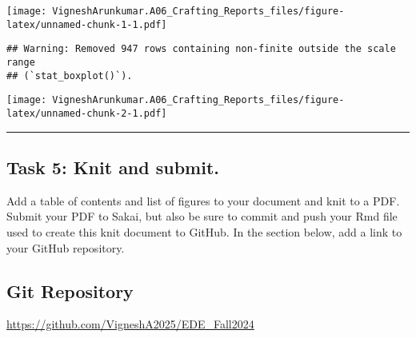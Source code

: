 \documentclass[
]{article}
\begin{document}
\texttt{[image: VigneshArunkumar.A06\_Crafting\_Reports\_files/figure-latex/unnamed-chunk-1-1.pdf]}

\begin{verbatim}
## Warning: Removed 947 rows containing non-finite outside the scale range
## (`stat_boxplot()`).
\end{verbatim}

\texttt{[image: VigneshArunkumar.A06\_Crafting\_Reports\_files/figure-latex/unnamed-chunk-2-1.pdf]}

\begin{center}\rule{0.5\linewidth}{0.5pt}\end{center}

\newpage

\subsection{Task 5: Knit and submit.}\label{task-5-knit-and-submit.}

Add a table of contents and list of figures to your document and knit to
a PDF. Submit your PDF to Sakai, but also be sure to commit and push
your Rmd file used to create this knit document to GitHub. In the
section below, add a link to your GitHub repository.

\subsection{Git Repository}\label{git-repository}

\url{https://github.com/VigneshA2025/EDE_Fall2024}
\end{document}
